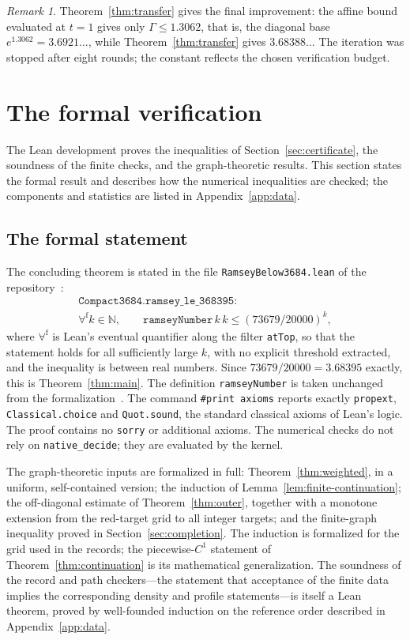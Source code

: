 \documentclass[11pt]{article}
\theoremstyle{definition}
\theoremstyle{remark}
\newtheorem{remark}[theorem]{Remark}
\newcommand{\Gam}{\Gamma}
\numberwithin{equation}{section}
\begin{document}
\begin{remark}
Theorem~\ref{thm:transfer} gives the final improvement: the affine bound
evaluated at $t=1$ gives only $\Gam\le1.3062$, that is, the diagonal
base $e^{1.3062}=3.6921\ldots$, while Theorem~\ref{thm:transfer}
gives $3.68388\ldots$ The iteration was stopped after eight rounds;
the constant reflects the chosen verification budget.
\end{remark}

\section{The formal verification}\label{sec:lean}

The Lean development proves the inequalities of
Section~\ref{sec:certificate}, the soundness of the finite checks,
and the graph-theoretic results. This section states the formal result
and describes how the numerical inequalities are checked; the
components and statistics are listed in Appendix~\ref{app:data}.

\subsection{The formal statement}

The concluding theorem is stated in the file
\texttt{RamseyBelow3684.lean} of the repository~\cite{Artifact}:
\begin{gather*}
 \texttt{Compact3684.ramsey\_le\_368395}:\\
 \forall^{\mathrm f}k\in\mathbb N,\qquad
 \texttt{ramseyNumber}\,k\,k\le(73679/20000)^k,
\end{gather*}
where $\forall^{\mathrm f}$ is Lean's eventual quantifier along the
filter \texttt{atTop}, so that the statement holds for all sufficiently
large $k$, with no explicit threshold extracted, and the inequality is
between real numbers. Since
$73679/20000=3.68395$ exactly, this is Theorem~\ref{thm:main}. The
definition \texttt{ramseyNumber} is taken unchanged from the
formalization~\cite{GNNWLean}. The command \texttt{\#print axioms}
reports exactly \texttt{propext}, \texttt{Classical.choice} and
\texttt{Quot.sound}, the standard classical axioms of Lean's logic.
The proof contains no \texttt{sorry} or additional axioms. The
numerical checks do not rely on \texttt{native\_decide}; they are
evaluated by the kernel.

The graph-theoretic inputs are formalized in full:
Theorem~\ref{thm:weighted}, in a uniform, self-contained version;
the induction of Lemma~\ref{lem:finite-continuation}; the
off-diagonal estimate of Theorem~\ref{thm:outer}, together with a
monotone extension from the red-target grid to all integer targets;
and the finite-graph inequality proved in
Section~\ref{sec:completion}. The induction is formalized for the
grid used in the records; the piecewise-$C^1$ statement of
Theorem~\ref{thm:continuation} is its mathematical generalization.
The soundness of the record and path
checkers---the statement that acceptance of the finite data implies
the corresponding density and profile statements---is itself a Lean
theorem, proved by well-founded induction on the reference order
described in Appendix~\ref{app:data}.
\end{document}

